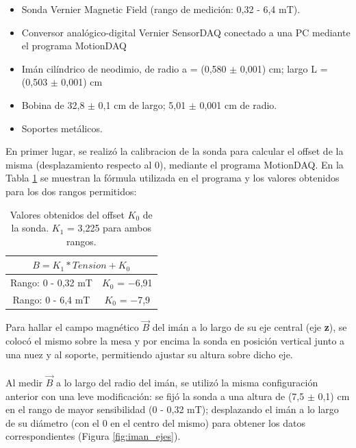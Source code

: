 \documentclass[12pt]{article}
\begin{document}
\begin{itemize}
    \item Sonda Vernier Magnetic Field (rango de medici\'on: 0,32 - 6,4 mT).
    
    \item Conversor analógico-digital Vernier SensorDAQ conectado a una PC mediante el programa MotionDAQ
    
    \item Im\'an cil\'indrico de neodimio, de radio a = (0,580 $\pm$ 0,001) cm; largo L = (0,503 $\pm$ 0,001) cm
    
    \item Bobina de 32,8 $\pm$ 0,1 cm de largo; 5,01 $\pm$ 0,001 cm de radio.
    
    \item Soportes met\'alicos.
\end{itemize}


En primer lugar, se realiz\'o la calibraci\´on de la sonda para calcular el offset de la misma (desplazamiento respecto al 0), mediante el programa MotionDAQ. En la Tabla \ref{tab:calib_sonda} se muestran la f\'ormula utilizada en el programa y los valores obtenidos para los dos rangos permitidos:

\begin{table}[h!]
\centering

\label{tab:calib_sonda}
\begin{tabular}{|c|c|}
\hline
\multicolumn{2}{|c|}{$B = K_{1}*Tension + K_{0}$} \\ \hline
Rango: 0 - 0,32 mT                       & $K_{0}$ = $-$6,91                  \\ \hline
Rango: 0 - 6,4 mT                  & $K_{0}$ = $-$7,9                  \\ \hline

\end{tabular}
\caption{Valores obtenidos del offset $K_{0}$ de la sonda. $K_{1}$ = 3,225 para ambos rangos.}
\end{table}

    
Para hallar el campo magn\'etico $\vec{B}$ del im\'an a lo largo de su eje central (eje \textbf{z}), se coloc\'o el mismo sobre la mesa y por encima la sonda en posici\'on vertical junto a una nuez y al soporte, permitiendo ajustar su altura sobre dicho eje.\\
\\
Al medir $\vec{B}$ a lo largo del radio del im\'an, se utiliz\'o la misma configuraci\'on anterior con una leve modificaci\'on: se fij\'o la sonda a una altura de (7,5 $\pm$ 0,1) cm en el rango de mayor sensibilidad (0 - 0,32 mT); desplazando el im\'an a lo largo de su di\'ametro (con el 0 en el centro del mismo) para obtener los datos correspondientes (Figura \ref{fig:iman_ejes}).
\end{document}
